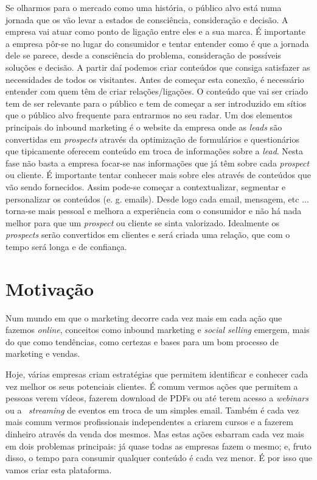 Se olharmos para o mercado como uma história, o público alvo está numa jornada que os vão levar a estados de consciência, consideração e decisão. A empresa vai atuar como ponto de ligação entre eles e a sua marca.
É importante a empresa pôr-se no lugar do consumidor e tentar entender como é que a jornada dele se parece, desde a consciência do problema, consideração de possíveis soluções e decisão. A partir daí podemos criar conteúdos que consiga satisfazer as necessidades de todos os visitantes.
Antes de começar esta conexão, é necessário entender com quem têm de criar relações/ligações. O conteúdo que vai ser criado tem de ser relevante para o público e tem de começar a ser introduzido em sítios que o público alvo frequente para entrarmos no seu radar. 
Um dos elementos principais do inbound marketing é o website da empresa onde as \textit{leads} são convertidas em \textit{prospects} através da optimização de formulários e questionários que tipicamente oferecem conteúdo em troca de informações sobre a \textit{lead}. 
Nesta fase não basta a empresa focar-se nas informações que já têm sobre cada \textit{prospect} ou cliente. É importante tentar conhecer mais sobre eles através de conteúdos que vão sendo fornecidos. Assim pode-se começar a contextualizar, segmentar e personalizar os conteúdos (e. g. emails). Desde logo cada email, mensagem, etc ... torna-se mais pessoal e melhora a experiência com o consumidor e não há nada melhor para que um \textit{prospect} ou cliente se sinta valorizado.
Idealmente os \textit{prospects} serão convertidos em clientes e será criada uma relação, que com o tempo será longa e de confiança.



\section{Motivação}
\label{subsec:motivacao}

Num mundo em que o marketing decorre cada vez mais em cada ação que fazemos \textit{online}, conceitos como inbound marketing e \textit{\gls{social selling}} emergem, mais do que como tendências, como certezas e bases para um bom processo de marketing e vendas.

Hoje, várias empresas criam estratégias que permitem identificar e conhecer cada vez melhor os seus potenciais clientes. É comum vermos ações que permitem a pessoas verem vídeos, fazerem download de PDFs ou até terem acesso a \textit{\gls{webinars}} ou a ~\textit{streaming} de eventos em troca de um simples email. Também é cada vez mais comum vermos profissionais independentes a criarem cursos e a fazerem dinheiro através da venda dos mesmos.
Mas estas ações esbarram cada vez mais em dois problemas principais: já quase todas as empresas fazem o mesmo; e, fruto disso, o tempo para consumir qualquer conteúdo é cada vez menor.
É por isso que vamos criar esta plataforma. 

